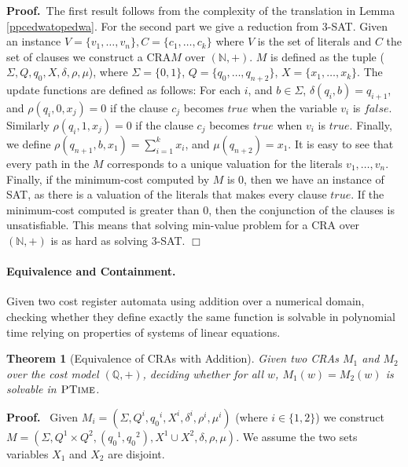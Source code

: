 \documentclass[11pt]{article}
\newtheorem{theorem}{Theorem}
\def\Proof{{\bf Proof.}}
\def\qed{{\bf $\Box$}}
\def\qed{{\bf $\Box$}}
\newcommand{\Nat}{\ensuremath{\mathbb{N}}}
\newcommand{\Rat}{\ensuremath{\mathbb{Q}}}
\newcommand{\inputalph}{\ensuremath{\Sigma}}
\newcommand{\ptime}{\ensuremath{\sc\textsc{PTime}}\xspace}
\newcommand{\EDWA}{{CRA}\xspace}
\newcommand{\edwa}{\ensuremath{M}}
\newcommand{\edwastates}{\ensuremath{Q}}
\newcommand{\edwastate}{\ensuremath{q}}
\newcommand{\edwainitst}{\ensuremath{\edwastate_0}}
\newcommand{\edwavariables}{\ensuremath{X}}
\newcommand{\edwatrans}{\ensuremath{\delta}}
\newcommand{\edwavarup}{\ensuremath{\rho}}
\newcommand{\edwafinal}{\ensuremath{\mu}}
\newcommand{\setof}[1]{\{#1\}}
\begin{document}
\Proof~The first result follows from the complexity of the translation
in Lemma \ref{ppcedwatopedwa}.  For the second part we give a
reduction from 3-SAT.  Given an instance $V=\{v_1,\ldots,v_n\},
C=\{c_1,\ldots,c_k\}$ where $V$ is the set of literals and $C$ the set
of clauses we construct a \EDWA $\edwa$ over $(\Nat,+)$. $\edwa$ is
defined as the tuple ($\Sigma, Q, q_0, X, \delta, \rho, \mu$), where
$\Sigma = \setof{0,1}$, $Q = \setof{q_0,\ldots,q_{n+2}}$, $X =
\setof{x_1,\ldots,x_k}$. The update functions are defined as follows:
For each $i$, and $b \in \Sigma$, $\delta(q_i,b) = q_{i+1}$, and
$\rho(q_i,0,x_j) = 0$ if the clause $c_j$ becomes $\mathit{true}$ when
the variable $v_i$ is $\mathit{false}$.  Similarly $\rho(q_i,1,x_j) =
0$ if the clause $c_j$ becomes $\mathit{true}$ when $v_i$ is
$\mathit{true}$.  Finally, we define $\rho(q_{n+1},b,x_1) =
\sum_{i=1}^k x_i$, and $\mu(q_{n+2}) = x_1$.  It is easy to see that
every path in the $\edwa$ corresponds to a unique valuation for the
literals $v_1,\ldots,v_n$. Finally, if the minimum-cost computed by
$\edwa$ is $0$, then we have an instance of SAT, as there is a
valuation of the literals that makes every clause $\mathit{true}$. If
the minimum-cost computed is greater than $0$, then the conjunction of
the clauses is unsatisfiable.  This means that solving min-value
problem for a \EDWA over $(\Nat,+)$ is as hard as solving 3-SAT.
\qed \\

\paragraph{Equivalence and Containment.} Given two cost register
automata using addition over a numerical domain, checking whether they
define exactly the same function is solvable in polynomial time
relying on properties of systems of linear equations.

\begin{theorem}[Equivalence of CRAs with Addition]\label{thm:equiv-CRA-add}
Given two CRAs $\edwa_1$ and $\edwa_2$ over the cost model $(\Rat,+)$,
deciding whether for all $w$, $\edwa_1(w)=\edwa_2(w)$ is solvable in $\ptime$.
\end{theorem}
\Proof~
Given $\edwa_i = (\inputalph, \edwastates^i, \edwainitst^i,
\edwavariables^i, \edwatrans^i, \edwavarup^i, \edwafinal^i)$ (where
$i\in\{1,2\}$) we construct $\edwa=(\inputalph,
\edwastates^1\times\edwastates^2, (\edwainitst^1,\edwainitst^2),
\edwavariables^1\cup\edwavariables^2, \edwatrans, \edwavarup,
\edwafinal)$. We assume the two sets variables $\edwavariables_1$ and
$\edwavariables_2$ are disjoint.
\end{document}
